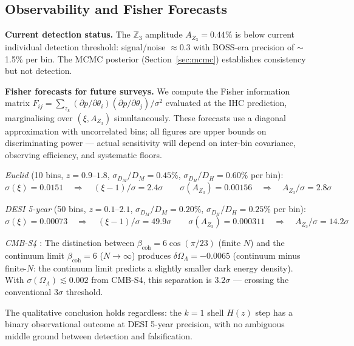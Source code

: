 \documentclass[12pt,a4paper]{article}
\begin{document}
\clearpage
\subsection{Observability and Fisher Forecasts}
\label{sec:observability}

\textbf{Current detection status.} The $\mathbb{Z}_3$ amplitude $A_{Z_3} = 0.44\%$ is below
current individual detection threshold: signal/noise $\approx 0.3$ with BOSS-era
precision of $\sim$1.5\% per bin. The MCMC posterior (Section~\ref{sec:mcmc}) establishes
consistency but not detection.

\textbf{Fisher forecasts for future surveys.} We compute the Fisher information matrix
$F_{ij} = \sum_{z_k} (\partial p/\partial\theta_i)(\partial p/\partial\theta_j)/\sigma^2$
evaluated at the IHC prediction, marginalising over $(\xi, A_{Z_3})$ simultaneously.
These forecasts use a diagonal approximation with uncorrelated bins; all figures are
upper bounds on discriminating power --- actual sensitivity will depend on
inter-bin covariance, observing efficiency, and systematic floors.

\textit{Euclid} \citep{Euclid} (10 bins, $z = 0.9$--$1.8$, $\sigma_{D_M}/D_M = 0.45\%$,
$\sigma_{D_H}/D_H = 0.60\%$ per bin):
\begin{equation}
  \sigma(\xi) = 0.0151 \quad \Rightarrow \quad (\xi-1)/\sigma = 2.4\sigma
  \qquad
  \sigma(A_{Z_3}) = 0.00156 \quad \Rightarrow \quad A_{Z_3}/\sigma = 2.8\sigma
\end{equation}

\textit{DESI 5-year} \citep{DESI} (50 bins, $z = 0.1$--$2.1$, $\sigma_{D_M}/D_M = 0.20\%$,
$\sigma_{D_H}/D_H = 0.25\%$ per bin):
\begin{equation}
  \sigma(\xi) = 0.00073 \quad \Rightarrow \quad (\xi-1)/\sigma = 49.9\sigma
  \qquad
  \sigma(A_{Z_3}) = 0.000311 \quad \Rightarrow \quad A_{Z_3}/\sigma = 14.2\sigma
\end{equation}

\textit{CMB-S4} \citep{CMBS4}: The distinction between
$\beta_\mathrm{coh} = 6\cos(\pi/23)$ (finite $N$) and the continuum limit
$\beta_\mathrm{coh} = 6$ ($N \to \infty$) produces $\delta\Omega_\Lambda = -0.0065$ (continuum minus finite-$N$:
the continuum limit predicts a slightly smaller dark energy density).
With $\sigma(\Omega_\Lambda) \lesssim 0.002$ from CMB-S4, this separation is
$3.2\sigma$ --- crossing the conventional 3$\sigma$ threshold.

The qualitative conclusion holds regardless: the $k=1$ shell $H(z)$ step has a
binary observational outcome at DESI 5-year precision, with no ambiguous middle
ground between detection and falsification.
\end{document}
